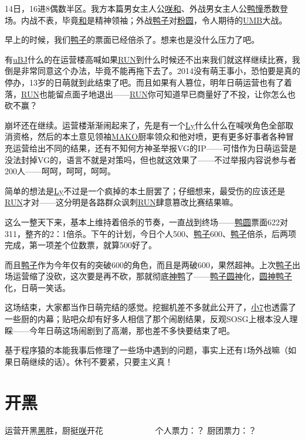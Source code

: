 14日，16进8偶数半区。我方本篇男女主人公\uline{咲}\uline{和}、外战男女主人公\uline{鸭}\uline{憧}悉数登场。内战不表，毕竟\uline{和}是精神领袖；外战\uline{鸭子}对\uline{粉圆}，令人期待的\uline{UMB}大战。

早上的时候，我们\uline{鸭子}的票面已经倍杀了。想来也是没什么压力了吧。

有\uline{uBJ}什么的在运营楼高喊如果\uline{RUN}到什么时候还不出来我们就这样继续比赛，我倒是非常同意这个办法，毕竟不能再拖下去了。2014没有萌王事小，恐怕要是真的停办，13岁的日萌就到此结束了吧。而且如果有人篡位，明年日萌运营也有了着落，\uline{RUN}也能留点面子地退出——\uline{RUN}你可知道早已商量好了不投，让你怎么也砍不赢？

崩坏还在继续。运营楼渐渐闹起来了，先是有一个\uline{Ly}什么什么在喊咲角色全部取消资格，然后的本土意见领袖\uline{MAKO}厨率领众和他对喷，更有更多好事者各种冒充运营给出不同的结果，还有不知何方神圣举报VG的IP——可惜作为日萌运营是没法封掉VG的，语言不就是对策吗，但也就这效果了——不过举报内容说参与者200人——呵呵，呵呵，呵呵。

简单的想法是\uline{Ly}不过是一个疯掉的本土厨罢了；仔细想来，最受伤的应该还是\uline{RUN}才对——这分明是各路群众讽刺\uline{RUN}肆意篡改比赛结果嘛。

这么一整天下来，基本上维持着倍杀的节奏，一直战到终场——\uline{鸭}\uline{圆}票面622对311，整齐的2：1倍杀。下午的计划，今日个人500、\uline{鸭子}600、\uline{鸭子}倍杀，后两项完成，第一项差个位数票，就算500好了。

而且\uline{鸭子}作为今年仅有的突破600的角色，而且是两破600，果然超神。上次\uline{鸭子}出场运营缩了没砍，这次要是再不砍，那就彻底\uline{神鸭}了——\uline{鸭子}\uline{圆神}化，\uline{圆神}\uline{鸭子}化，日萌一笑话。

这场结束，大家都当作日萌完结的感觉。挖掘机差不多就此公开了，\uline{小7}也透露了一些厨的内幕；贴吧众却有好多人相信了那个闹剧结果，反观SOSG上根本没人理睬——今年日萌这场闹剧到了高潮，那也差不多快要结束了吧。

基于程序猿的本能我事后修理了一些场中遇到的问题，事实上还有1场外战嘛（如果日萌继续的话）。休刊不要紧，只要主义真！

\chapter{开黑}
\begin{center}
{\subTitle 运营开黑\uline{黑}胜，厨挺\uline{咲}开花}
\subMemo
　　　　　　个人票力：？ 厨团票力：？
\end{center}

